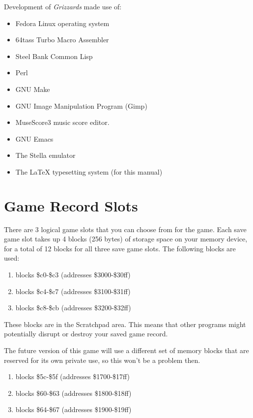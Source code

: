 \documentclass[12pt,openright,book]{memoir}
\begin{document}
\begin{description}
Development of \textit{Grizzards} made use of:

\begin{itemize}
\item Fedora Linux\registered{} operating system
\item 64tass Turbo Macro Assembler
\item Steel Bank Common Lisp
\item Perl
\item GNU Make
\item GNU Image Manipulation Program (Gimp)
\item MuseScore3 music score editor.
\item GNU Emacs
\item The Stella emulator
\item The \LaTeX{} typesetting system (for this manual)
\end{itemize}

\section{Game Record Slots}

There are 3  logical game slots that  you can choose from  for the game.
Each save game  slot takes up 4  blocks (256 bytes) of  storage space on
your memory  device, for a  total of 12 blocks  for all three  save game
slots. The following blocks are used:

\ifdefined\DEMO

\begin{enumerate}
\item blocks \$c0-\$c3 (addresses \$3000-\$30ff)
\item blocks \$c4-\$c7 (addresses \$3100-\$31ff)
\item blocks \$c8-\$cb (addresses \$3200-\$32ff)
\end{enumerate}

These blocks are in the Scratchpad  area. This means that other programs
might potentially disrupt or destroy your saved game record.

The  future version  of this  game will  use a  different set  of memory
blocks  that are  reserved for  its own  private use,  so this  won't be
a problem then.

\else

\begin{enumerate}
\item blocks \$5c-\$5f (addresses \$1700-\$17ff)
\item blocks \$60-\$63 (addresses \$1800-\$18ff)
\item blocks \$64-\$67 (addresses \$1900-\$19ff)
\end{enumerate}


\end{description}
\end{document}
